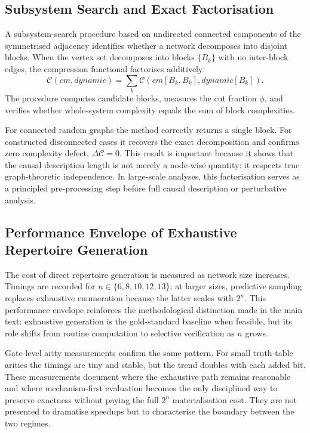 \documentclass[11pt]{article}
\theoremstyle{definition}
\begin{document}
\subsection{Subsystem Search and Exact Factorisation}
A subsystem-search procedure based on undirected connected components of the symmetrised adjacency identifies whether a network decomposes into disjoint blocks. When the vertex set decomposes into blocks \(\{B_k\}\) with no inter-block edges, the compression functional factorises additively:
\[
\mathcal{C}(cm,dynamic)=\sum_k \mathcal{C}(cm[B_k,B_k],dynamic[B_k]).
\]
The procedure computes candidate blocks, measures the cut fraction \(\phi\), and verifies whether whole-system complexity equals the sum of block complexities.

For connected random graphs the method correctly returns a single block. For constructed disconnected cases it recovers the exact decomposition and confirms zero complexity defect, \(\Delta\mathcal{C}=0\). This result is important because it shows that the causal description length is not merely a node-wise quantity: it respects true graph-theoretic independence. In large-scale analyses, this factorisation serves as a principled pre-processing step before full causal description or perturbative analysis.

\subsection{Performance Envelope of Exhaustive Repertoire Generation}
The cost of direct repertoire generation is measured as network size increases. Timings are recorded for \(n\in\{6,8,10,12,13\}\); at larger sizes, predictive sampling replaces exhaustive enumeration because the latter scales with \(2^n\). This performance envelope reinforces the methodological distinction made in the main text: exhaustive generation is the gold-standard baseline when feasible, but its role shifts from routine computation to selective verification as \(n\) grows.

Gate-level arity measurements confirm the same pattern. For small truth-table arities the timings are tiny and stable, but the trend doubles with each added bit. These measurements document where the exhaustive path remains reasonable and where mechanism-first evaluation becomes the only disciplined way to preserve exactness without paying the full \(2^n\) materialisation cost. They are not presented to dramatise speedups but to characterise the boundary between the two regimes.
\end{document}
